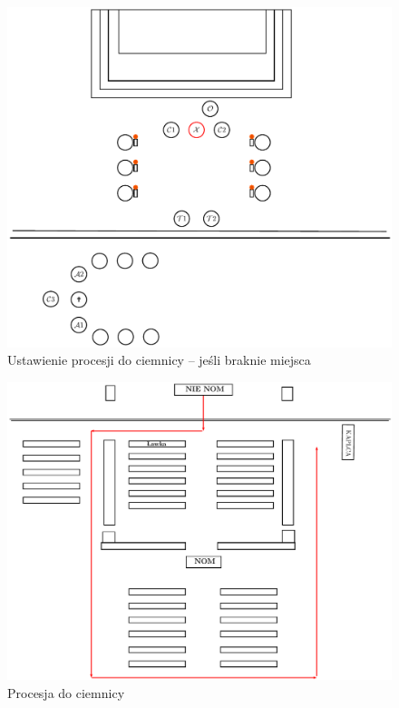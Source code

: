 \begin{figure}[h]
\begin{minipage}{0.6\linewidth}
            \includegraphics[width=\linewidth]{Figures/Czwartek/Procesja1.pdf}
            \caption{Ustawienie procesji do ciemnicy -- jeśli braknie miejsca}
            \label{fig:procesja2_czw}
      \end{minipage}
\end{figure}
\vfill
\begin{figure}[h]
      \centering
      \includegraphics[width=0.7\linewidth]{Figures/Czwartek/Procesja3.pdf}
      \caption{Procesja do ciemnicy}
      \label{fig:procesja3_czw}
\end{figure}
\clearpage
